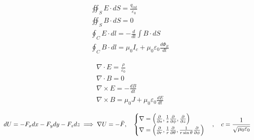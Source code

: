 \documentclass{article}
\newcommand{\h}{\hspace{1em}}
\begin{document}
\begin{minipage}{0.4\textwidth}
\begin{align*}
    & \oiint_S E\cdot dS = \frac{q_{int}}{\varepsilon_0}\\
    & \oiint_S B\cdot dS =0 \\
    & \oint_C E\cdot dl = - \frac{d}{dt}\int B\cdot dS  \\
    & \oint_C B\cdot dl = \mu_0I_c + \mu_0\varepsilon_0\frac{d\Phi_E}{dt}
\end{align*}
\end{minipage}
\begin{minipage}{0.4\textwidth}
\begin{align}
    & \nabla \cdot E = \frac{\rho}{\varepsilon_0} \\
    & \nabla \cdot B = 0 \\
    &  \nabla \times E = -\frac{dB}{dt} \\
    & \nabla \times B = \mu_0J + \mu_0\varepsilon_0\frac{dE}{dt}
\end{align}
\end{minipage}
\[dU = -F_xdx -F_ydy -F_zdz \implies \nabla U = -\Bar{F}, \hspace{1em}
\begin{cases}
    \nabla = \left( \frac{\partial}{\partial s} ,\frac{1}{s}\frac{\partial}{\partial \phi}, \frac{\partial}{\partial z} \right) \\
    \nabla = \left( \frac{\partial}{\partial r} ,\frac{1}{r}\frac{\partial}{\partial \theta}, \frac{1}{r\sin\theta}\frac{\partial}{\partial \phi} \right)
\end{cases}, \h c = \frac{1}{\sqrt{\mu_0\varepsilon_0}}\]




\newpage
\noindent
\end{document}
